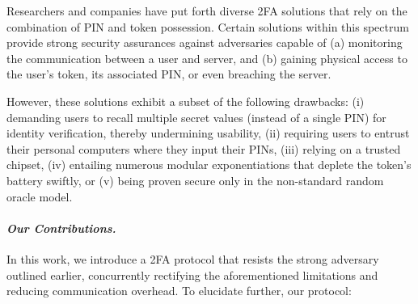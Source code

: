

Researchers and companies have put forth diverse 2FA solutions that rely on the combination of PIN and token possession. Certain solutions within this spectrum provide strong security assurances against adversaries capable of (a) monitoring the communication between a user and server, and (b) gaining physical access to the user's token, its associated PIN, or even breaching the server.


However, these solutions exhibit a subset of the following drawbacks:  (i) demanding users to recall multiple secret values (instead of a single PIN) for identity verification, thereby undermining usability, (ii) requiring users to entrust their personal computers where they input their PINs, (iii) relying on a trusted chipset,  (iv) entailing numerous modular exponentiations that deplete the token's battery swiftly, or (v) being proven secure only in the non-standard random oracle model.







\paragraph{\textbf{\textit{Our Contributions.}}}  In this work, we introduce a 2FA protocol that resists the strong adversary outlined earlier, concurrently rectifying the aforementioned limitations and reducing communication overhead. To elucidate further, our protocol:

